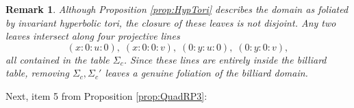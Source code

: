 \documentclass{article}
\newtheorem{rmk}{Remark}
\begin{document}
\begin{appendix}
\begin{rmk}
    Although Proposition \ref{prop:HypTori} describes the domain as foliated by invariant hyperbolic tori, the closure of these leaves is not disjoint. Any two leaves intersect along four projective lines
    \[(x: 0: u :0),\;  (x: 0 : 0 :v), \;  (0: y : u :0), \; (0: y: 0: v),\]
    all contained in the table $\Sigma_c$. Since these lines are entirely inside the billiard table, removing $\Sigma_c, \Sigma_c'$ leaves a genuine foliation of the billiard domain.
\end{rmk}






Next, item 5 from Proposition \ref{prop:QuadRP3}:


\end{appendix}
\end{document}
